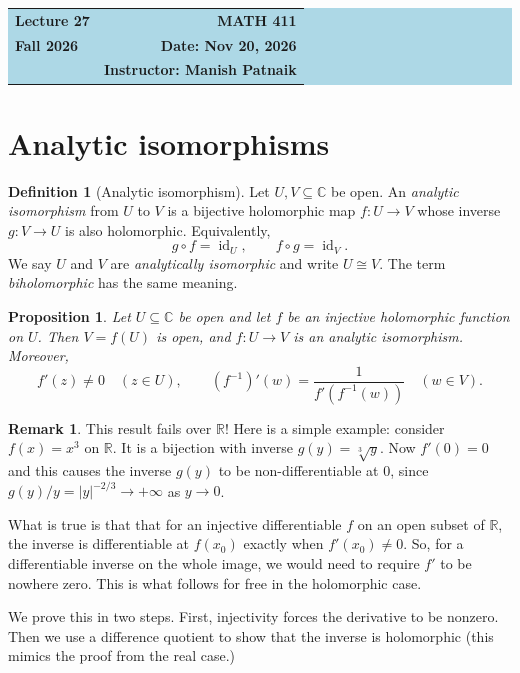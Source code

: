 \documentclass[11pt]{article}
\theoremstyle{plain}
\newtheorem{proposition}[theorem]{Proposition}
\theoremstyle{definition}
\newtheorem{definition}[theorem]{Definition}
\theoremstyle{boldremark}
\newtheorem*{remark}{Remark}
\theoremstyle{remark}
\numberwithin{equation}{section}
\newcommand{\C}{\mathbb{C}}
\newcommand{\R}{\mathbb{R}}
\begin{document}
\begin{center}
  \colorbox{lightblue}{%
    \begin{minipage}{0.94\textwidth}
      \vspace{0.55em}
      \begin{tabular*}{\textwidth}{@{\extracolsep{\fill}}lr}
        {\color{courseblue}\bfseries\LARGE Lecture 27} &
        {\color{courseblue}\bfseries\LARGE MATH 411}\\[0.35em]
        \textbf{Fall 2026} & \textbf{Date: Nov 20, 2026}\\
        & \textbf{Instructor: Manish Patnaik}
      \end{tabular*}
      \vspace{0.45em}
    \end{minipage}}
\end{center}

\setcounter{tocdepth}{1}
\tableofcontents
\vspace{0.45em}

\section{Analytic isomorphisms}
\begin{definition}[Analytic isomorphism]
Let $U,V\subseteq\C$ be open. An \emph{analytic isomorphism} from $U$ to $V$
is a bijective holomorphic map $f:U\to V$ whose inverse $g:V\to U$ is also
holomorphic. Equivalently,
\[
 g\circ f=\operatorname{id}_U,\qquad
 f\circ g=\operatorname{id}_V.
\]
We say $U$ and $V$ are \emph{analytically isomorphic} and write $U\cong V$.
The term \emph{biholomorphic} has the same meaning.
\end{definition}

\begin{proposition}\label{prop:analytic-inverse}
Let $U\subseteq\C$ be open and let $f$ be an injective holomorphic function
on $U$. Then $V=f(U)$ is open, and $f:U\to V$ is an analytic isomorphism.
Moreover,
\[
 f'(z)\ne0\quad(z\in U),\qquad
 (f^{-1})'(w)=\frac{1}{f'(f^{-1}(w))}\quad(w\in V).
\]
\end{proposition}

\begin{remark} This result fails over $\R$! Here is a simple example: consider $f(x)=x^3$ on $\R$. It is a bijection with inverse $g(y) = \sqrt[3]{y}$. Now $f'(0)=0$ and this causes the inverse $g(y)$ to be non-differentiable at $0$, since
		$g(y)/y=|y|^{-2/3}\to+\infty$ as $y\to0$.

		What is true is that that for an injective differentiable $f$ on an open subset of $\R$, the
		inverse is differentiable at $f(x_0)$ exactly when $f'(x_0)\ne0$.
		So, for a differentiable inverse on the whole image, we would need to require $f'$ to be
		nowhere zero. This is what follows for free in the holomorphic case.

\end{remark}
We prove this in two steps. First, injectivity forces the derivative to
be nonzero. Then we use a difference quotient to show that the inverse
is holomorphic (this mimics the proof from the real case.)
\end{document}
